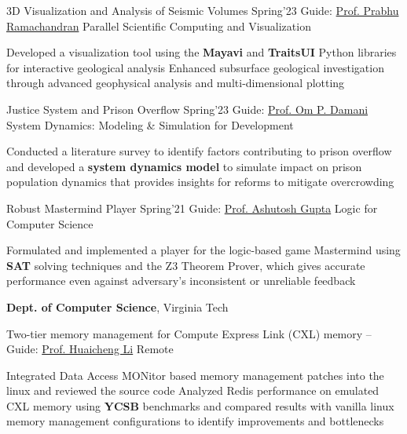 \Gap
\BulletItem
3D Visualization and Analysis of Seismic Volumes \href{https://github.com/rajagond/AE6102_sifar}{\faGithub} \hfill Spring'23 \newline
{\small Guide: \href{https://www.aero.iitb.ac.in/~prabhu/}{Prof. Prabhu Ramachandran}} \hfill {\footnotesize Parallel Scientific Computing and Visualization}
\begin{Detail}
    \SubBulletItem Developed a visualization tool using the {\bf Mayavi} and {\bf TraitsUI} Python libraries for interactive geological analysis
     \SubBulletItem  Enhanced subsurface geological investigation through advanced geophysical analysis and multi-dimensional plotting
\end{Detail}

\Gap
\BulletItem
Justice System and Prison Overflow \href{https://github.com/rajagond/CS752-Justice-System-and-Prison-Overflow}{\faGithub} \hfill Spring'23 \newline
{\small Guide: \href{https://www.cse.iitb.ac.in/~damani/}{Prof. Om P. Damani}} \hfill {\footnotesize System Dynamics: Modeling \& Simulation for Development}
\begin{Detail}
    \SubBulletItem Conducted a literature survey to identify factors contributing to prison overflow and developed a {\bf system dynamics model} to simulate impact on prison population dynamics that provides insights for reforms to mitigate overcrowding
\end{Detail}

\Gap
\BulletItem
Robust Mastermind Player \href{https://github.com/rajagond/CS228-LOGIC}{\faGithub} \hfill Spring'21 \newline
{\small Guide: \href{https://www.cse.iitb.ac.in/~akg/}{Prof. Ashutosh Gupta}} \hfill {\footnotesize Logic for Computer Science}
\begin{Detail}
    \SubBulletItem Formulated and implemented a player for the logic-based game Mastermind using {\bf SAT} solving techniques and the Z3 Theorem Prover, which gives accurate performance even against adversary's inconsistent or unreliable feedback
\end{Detail}

\BigGap
\Entry
\textbf{Dept. of Computer Science}, Virginia Tech

\Gap
\BulletItem
Two-tier memory management for Compute Express Link (CXL) memory 
\hfill 
{} --  
\newline
{\small Guide: \href{https://huaicheng.github.io/}{Prof. Huaicheng Li}} \hfill {\footnotesize Remote}
\begin{Detail}
    \SubBulletItem Integrated Data Access MONitor based memory management patches into the linux and reviewed the source code
    \SubBulletItem Analyzed Redis performance on emulated CXL memory using {\bf YCSB} benchmarks and compared results with vanilla linux memory management configurations to identify improvements and bottlenecks
\end{Detail}